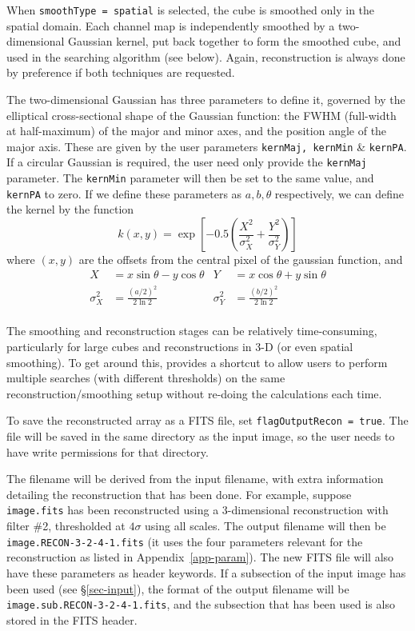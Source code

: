 
When \texttt{smoothType = spatial} is selected, the cube is smoothed
only in the spatial domain. Each channel map is independently smoothed
by a two-dimensional Gaussian kernel, put back together to form the
smoothed cube, and used in the searching algorithm (see below). Again,
reconstruction is always done by preference if both techniques are
requested.

The two-dimensional Gaussian has three parameters to define it,
governed by the elliptical cross-sectional shape of the Gaussian
function: the FWHM (full-width at half-maximum) of the major and minor
axes, and the position angle of the major axis. These are given by the
user parameters \texttt{kernMaj, kernMin} \& \texttt{kernPA}. If a
circular Gaussian is required, the user need only provide the
\texttt{kernMaj} parameter. The \texttt{kernMin} parameter will then
be set to the same value, and \texttt{kernPA} to zero.  If we define
these parameters as $a,b,\theta$ respectively, we can define the
kernel by the function
\[ 
k(x,y) = \exp\left[-0.5 \left(\frac{X^2}{\sigma_X^2} + 
                              \frac{Y^2}{\sigma_Y^2}   \right) \right] 
\]
where $(x,y)$ are the offsets from the central pixel of the gaussian
function, and 
\begin{align*}
X& = x\sin\theta - y\cos\theta&
  Y&= x\cos\theta + y\sin\theta\\
\sigma_X^2& = \frac{(a/2)^2}{2\ln2}&
  \sigma_Y^2& = \frac{(b/2)^2}{2\ln2}\\
\end{align*}

\label{sec-reconIO}

The smoothing and reconstruction stages can be relatively
time-consuming, particularly for large cubes and reconstructions in
3-D (or even spatial smoothing). To get around this, \duchamp provides
a shortcut to allow users to perform multiple searches (\eg with
different thresholds) on the same reconstruction/smoothing setup
without re-doing the calculations each time.

To save the reconstructed array as a FITS file, set
\texttt{flagOutputRecon = true}. The file will be saved in the same
directory as the input image, so the user needs to have write
permissions for that directory.

The filename will be derived from the input filename, with extra
information detailing the reconstruction that has been done. For
example, suppose \texttt{image.fits} has been reconstructed using a
3-dimensional reconstruction with filter \#2, thresholded at $4\sigma$
using all scales. The output filename will then be
\texttt{image.RECON-3-2-4-1.fits} (\ie it uses the four parameters
relevant for the \atrous reconstruction as listed in
Appendix~\ref{app-param}). The new FITS file will also have these
parameters as header keywords. If a subsection of the input image has
been used (see \S\ref{sec-input}), the format of the output filename
will be \texttt{image.sub.RECON-3-2-4-1.fits}, and the subsection that
has been used is also stored in the FITS header.

